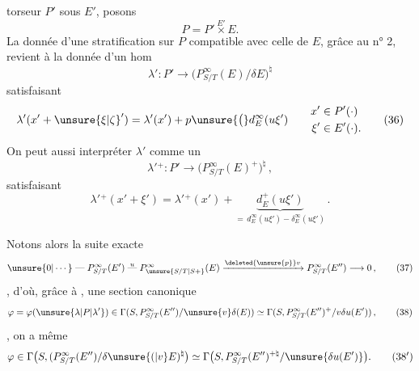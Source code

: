 torseur $P'$ sous $E'$, posons
\[
 P=P'\mathbin{\overset{E'}{\times}}E . \tag*{(34)}
\]
La donnée d'une stratification sur $P$ compatible avec celle de $E$, grâce au n° 2, revient à la donnée d'un hom
\[
 \lambda':P'\longrightarrow \bigl(P^\infty_{S/T}(E)/\delta E\bigr)^\natural \tag*{(35)}
\]
satisfaisant
\[
 \lambda'(x'+{\unsure{\xi|\zeta}}')=\lambda'(x')+p\unsure{\bigl(}d^\infty_E(u\xi')\qquad
 \begin{aligned}x'&\in P'(\cdot)\\ \xi'&\in E'(\cdot).\end{aligned} \tag*{(36)}
\]
On peut aussi interpréter $\lambda'$ comme un
\[
 \lambda'{}^+:P'\longrightarrow\bigl(P^\infty_{S/T}(E)^+\bigr)^\natural \,, \tag*{(35$'$)}
\]
satisfaisant
\[
 \lambda'{}^+(x'+\xi')=\lambda'{}^+(x')+
 \underbrace{d^+_E(u\xi')}_{=\,d^\infty_E(u\xi')-\delta^\infty_E(u\xi')}\,. \tag*{(36)$'$}
\]

 Notons alors la suite exacte 
\[
 \unsure{0|\cdots}\mathrel{\text{---}}P^\infty_{S/T}(E')\mathrel{\overset{u}{\text{---}}}P^\infty_{\unsure{S/T|S+}}(E)\xrightarrow{\deleted{\unsure{p}}v}P^\infty_{S/T}(E'')\longrightarrow 0 \,, \tag*{(37)}
\]
, d'où, grâce à  , une section canonique
\[
 \varphi=\varphi(\unsure{\lambda|P|\lambda'})\in\Gamma(S,P^\infty_{S/T}(E'')/\unsure{v}\delta(E))\simeq
 \Gamma(S,P^\infty_{S/T}(E'')^+/v\delta u(E')) \,, \tag*{(38)}
\]
 ,  on a  même
\[
 \varphi\in\Gamma\bigl(S,(P^\infty_{S/T}(E'')/\delta\unsure{(|v}E)^\natural\bigr)\simeq
 \Gamma\bigl(S,P^\infty_{S/T}(E'')^{+\natural}/\unsure{\delta u(E')}\bigr). \tag*{(38$'$)}
\]
